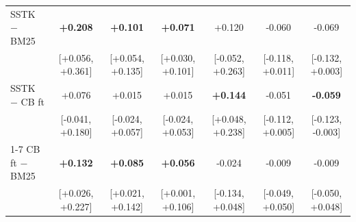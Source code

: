 \begin{table}[!htbp]
\begin{tabular}{lcccccc}
\quad SSTK $-$ BM25 & \textbf{+0.208} & \textbf{+0.101} & \textbf{+0.071} & +0.120 & -0.060 & -0.069 \\
 & [+0.056, +0.361] & [+0.054, +0.135] & [+0.030, +0.101] & [-0.052, +0.263] & [-0.118, +0.011] & [-0.132, +0.003] \\[2pt]
\quad SSTK $-$ CB ft & +0.076 & +0.015 & +0.015 & \textbf{+0.144} & -0.051 & \textbf{-0.059} \\
 & [-0.041, +0.180] & [-0.024, +0.057] & [-0.024, +0.053] & [+0.048, +0.238] & [-0.112, +0.005] & [-0.123, -0.003] \\[2pt]
\cmidrule(lr){1-7}
\quad CB ft $-$ BM25 & \textbf{+0.132} & \textbf{+0.085} & \textbf{+0.056} & -0.024 & -0.009 & -0.009 \\
 & [+0.026, +0.227] & [+0.021, +0.142] & [+0.001, +0.106] & [-0.134, +0.048] & [-0.049, +0.050] & [-0.050, +0.048] \\[2pt]
\bottomrule
\end{tabular}
\end{table}
